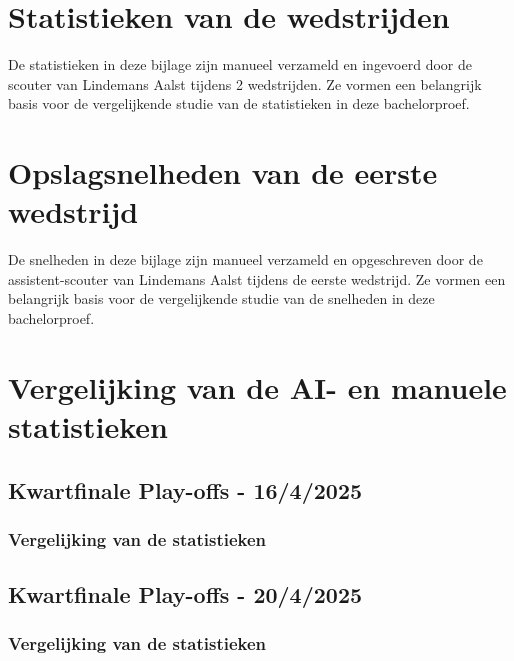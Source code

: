 \documentclass[dutch,dit,thesis]{hogentreport}
\begin{document}
\chapter{Statistieken van de wedstrijden}
De statistieken in deze bijlage zijn manueel verzameld en ingevoerd door de scouter van Lindemans Aalst tijdens 2 wedstrijden. Ze vormen een belangrijk basis voor de vergelijkende studie van de statistieken in deze bachelorproef.











\chapter{Opslagsnelheden van de eerste wedstrijd}
De snelheden in deze bijlage zijn manueel verzameld en opgeschreven door de assistent-scouter van Lindemans Aalst tijdens de eerste wedstrijd. Ze vormen een belangrijk basis voor de vergelijkende studie van de snelheden in deze bachelorproef.



\chapter{Vergelijking van de AI- en manuele statistieken}
\label{ch:statistieken}
\section{Kwartfinale Play-offs - 16/4/2025}
\subsection{Vergelijking van de statistieken}




\section{Kwartfinale Play-offs - 20/4/2025}
\subsection{Vergelijking van de statistieken}





\backmatter{}

\setlength\bibitemsep{2pt} %
\printbibliography[heading=bibintoc]
\end{document}
